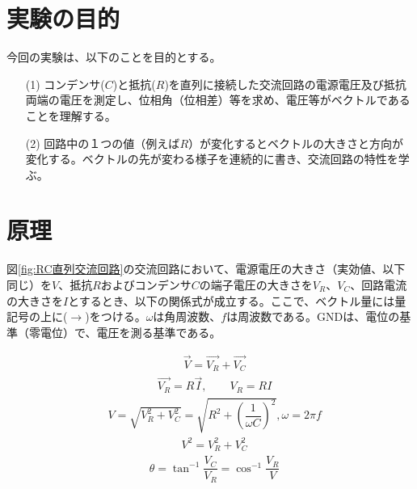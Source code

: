 \documentclass[10pt,a4paper]{jsarticle}
\numberwithin{equation}{section}
\numberwithin{figure}{section}
\numberwithin{table}{section}
\begin{document}
\section{実験の目的}
今回の実験は、以下のことを目的とする。
  \begin{itemize}
    \item [(1)] コンデンサ($C$)と抵抗($R$)を直列に接続した交流回路の電源電圧及び抵抗両端の電圧を測定し、位相角（位相差）等を求め、電圧等がベクトルであることを理解する。
    \item [(2)] 回路中の１つの値（例えば$R$）が変化するとベクトルの大きさと方向が変化する。ベクトルの先が変わる様子を連続的に書き、交流回路の特性を学ぶ。
  \end{itemize}

\section{原理}
  図\ref{fig:RC直列交流回路}の交流回路において、電源電圧の大きさ（実効値、以下同じ）を$V$、抵抗$R$およびコンデンサ$C$の端子電圧の大きさを$V_R$、$V_C$、回路電流の大きさを$I$とするとき、以下の関係式が成立する。ここで、ベクトル量には量記号の上に($\rightarrow$)をつける。$\omega$は角周波数、$f$は周波数である。GNDは、電位の基準（零電位）で、電圧を測る基準である。

  \begin{equation}
    \begin{split}
        &\vec{V}=\vec{V_R} + \vec{V_C}
    \end{split}
  \end{equation}
  \begin{equation}
    \begin{split}
        &\vec{V_R}=R\vec{I}, \quad\quad V_R=RI
    \end{split}
  \end{equation}
  \begin{equation}
    \begin{split}
        &V=\sqrt{V^2_R + V^2_C}=\sqrt{R^2 + \left( \dfrac{1}{\omega C} \right)^2}, \omega=2 \pi f
    \end{split}
  \end{equation}
  \begin{equation}
    \begin{split}
        &V^2=V^2_R + V^2_C
    \end{split}
  \end{equation}
  \begin{equation}
    \begin{split}
        &\theta= \tan^{-1}\dfrac{V_C}{V_R}=\cos^{-1}\dfrac{V_R}{V} 
    \end{split}
  \end{equation}
  
\end{document}
